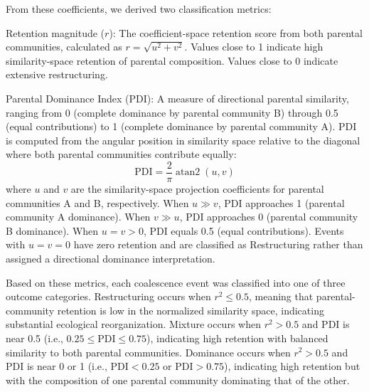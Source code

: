 From these coefficients, we derived two classification metrics:

Retention magnitude ($r$): The coefficient-space retention score from both parental communities, calculated as $r = \sqrt{u^2 + v^2}$. Values close to 1 indicate high similarity-space retention of parental composition. Values close to 0 indicate extensive restructuring.

Parental Dominance Index (PDI): A measure of directional parental similarity, ranging from 0 (complete dominance by parental community B) through 0.5 (equal contributions) to 1 (complete dominance by parental community A). PDI is computed from the angular position in similarity space relative to the diagonal where both parental communities contribute equally:
\begin{equation}
\text{PDI} = \frac{2}{\pi} \operatorname{atan2}(u, v)
\label{eq:pdi}
\end{equation}
where $u$ and $v$ are the similarity-space projection coefficients for parental communities A and B, respectively. When $u \gg v$, PDI approaches 1 (parental community A dominance). When $v \gg u$, PDI approaches 0 (parental community B dominance). When $u = v > 0$, PDI equals 0.5 (equal contributions). Events with $u=v=0$ have zero retention and are classified as Restructuring rather than assigned a directional dominance interpretation.

Based on these metrics, each coalescence event was classified into one of three outcome categories. Restructuring occurs when $r^2 \leq 0.5$,  meaning that parental-community retention is low in the normalized similarity space, indicating substantial ecological reorganization. Mixture occurs when $r^2 > 0.5$ and PDI is near 0.5 (i.e., $0.25 \leq \text{PDI} \leq 0.75$), indicating high retention with balanced similarity to both parental communities. Dominance occurs when $r^2 > 0.5$ and PDI is near 0 or 1 (i.e., $\text{PDI} < 0.25$ or $\text{PDI} > 0.75$), indicating high retention but with the composition of one parental community dominating that of the other.


